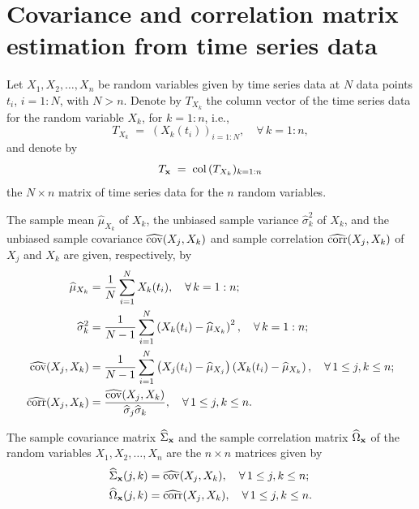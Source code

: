 
\section{Covariance and correlation matrix estimation from time series data}

Let $X_1, X_2, \ldots, X_n$ be random variables given by time series data at $N$
data points $t_i$, $i = 1:N$, with $N > n$. Denote by $T_{X_k}$ the column vector of
the time series data for the random variable $X_k$, for $k = 1:n$, i.e.,
\begin{equation}
T_{X_k} \;=\; (X_k(t_i))_{i=1:N}, \quad \forall\, k = 1:n,
\end{equation}
and denote by
\begin{equation}
T_{\mathbf{x}} \;=\; \mathrm{col}\,(T_{X_k})_{k=1:n}
\end{equation}
the $N \times n$ matrix of time series data for the $n$ random variables.

The sample mean $\widehat{\mu}_{X_k}$ of $X_k$, the unbiased sample variance
$\widehat{\sigma}_k^2$ of $X_k$, and the unbiased sample covariance
$\widehat{\operatorname{cov}}(X_j,X_k)$ and sample correlation $\widehat{\operatorname{corr}}(X_j,X_k)$ of $X_j$
and $X_k$ are given, respectively, by
\begin{align}
\widehat{\mu}_{X_k} &= \frac{1}{N}\sum_{i=1}^N X_k(t_i), \quad \forall\, k = 1:n; \\
\widehat{\sigma}_k^2 &= \frac{1}{N-1}\sum_{i=1}^N \left(X_k(t_i)-\widehat{\mu}_{X_k}\right)^2, \quad \forall\, k = 1:n; \\
\widehat{\operatorname{cov}}(X_j,X_k) &= \frac{1}{N-1}\sum_{i=1}^N \left(X_j(t_i)-\widehat{\mu}_{X_j}\right)\left(X_k(t_i)-\widehat{\mu}_{X_k}\right), \quad \forall\, 1\le j,k\le n; \\
\widehat{\operatorname{corr}}(X_j,X_k) &= \frac{\widehat{\operatorname{cov}}(X_j,X_k)}{\widehat{\sigma}_j\widehat{\sigma}_k}, \quad \forall\, 1\le j,k\le n.
\end{align}

The sample covariance matrix $\widehat{\Sigma}_{\mathbf{x}}$ and the sample correlation
matrix $\widehat{\Omega}_{\mathbf{x}}$ of the random variables $X_1, X_2, \ldots, X_n$ are
the $n \times n$ matrices given by
\begin{align}
\widehat{\Sigma}_{\mathbf{x}}(j,k) &= \widehat{\operatorname{cov}}(X_j,X_k), \quad \forall\, 1\le j,k\le n; \\
\widehat{\Omega}_{\mathbf{x}}(j,k) &= \widehat{\operatorname{corr}}(X_j,X_k), \quad \forall\, 1\le j,k\le n.
\end{align}

